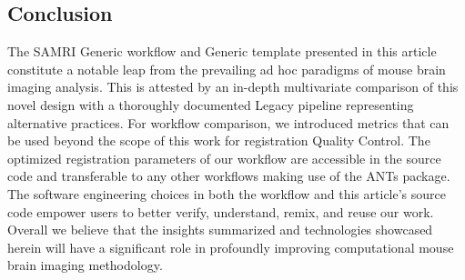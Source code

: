 \subsection{Conclusion}

The SAMRI Generic workflow and Generic template presented in this article constitute a notable leap from the prevailing ad hoc paradigms of mouse brain imaging analysis.
This is attested by an in-depth multivariate comparison of this novel design with a thoroughly documented Legacy pipeline representing alternative practices.
For workflow comparison, we introduced metrics that can be used beyond the scope of this work for registration Quality Control.
The optimized registration parameters of our workflow are accessible in the source code and transferable to any other workflows making use of the ANTs package.
The software engineering choices in both the workflow and this article's source code empower users to better verify, understand, remix, and reuse our work.
Overall we believe that the insights summarized and technologies showcased herein will have a significant role in profoundly improving computational mouse brain imaging methodology.

